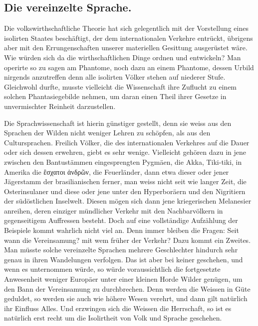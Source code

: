 {\subsection*{Die vereinzelte Sprache.}
\largerpage[2] Die volkswirthschaftliche Theorie hat sich gelegentlich mit der Vorstellung eines isolirten Staates beschäftigt, der dem internationalen Verkehre entrückt, übrigens aber mit den Errungenschaften unserer materiellen Gesittung ausgerüstet wäre. Wie würden sich da die wirthschaftlichen Dinge ordnen und entwickeln? \label{sp.177} Man operirte so zu sagen am Phantome, noch dazu an einem Phantome, dessen Urbild nirgends anzutreffen  denn alle isolirten Völker stehen auf niederer  Stufe. Gleichwohl durfte, musste vielleicht die Wissenschaft ihre Zuflucht zu einem solchen Phantasiegebilde nehmen, um daran einen Theil ihrer Gesetze in unvermischter Reinheit darzustellen.

\label{fp.186}

Die Sprachwissenschaft ist hierin günstiger gestellt, denn sie weiss aus den Sprachen der Wilden nicht weniger Lehren zu schöpfen, als aus den Cultursprachen. Freilich Völker, die des internationalen Verkehres auf die Dauer  oder sich dessen erwehren, giebt es sehr wenige. Vielleicht gehören dazu in  jene zwischen den Bantustämmen eingesprengten Pygmäen, die Akka, Tiki-tiki, in Amerika die ἒσχατοι ἀνδρῶν, die Feuerländer, dann etwa dieser oder jener Jägerstamm der brasilianischen  ferner, man weiss nicht seit wie langer Zeit, die Osterinsulaner und diese oder jene unter den Hyperboräern und den Nigritiern der südöstlichen Inselwelt. Diesen mögen sich dann jene kriegerischen Melanesier anreihen, deren einziger mündlicher Verkehr mit den Nachbarvölkern in gegenseitigem Auffressen besteht. Doch auf eine vollständige Aufzählung der Beispiele kommt wahrlich nicht viel an. Denn immer bleiben die Fragen: Seit wann die Vereinsamung? mit wem früher der Verkehr? Dazu kommt ein Zweites. Man müsste solche vereinzelte Sprachen mehrere Geschlechter hindurch sehr genau in ihren Wandelungen verfolgen. Das ist aber bei keiner geschehen, und wenn es unternommen würde, so würde voraussichtlich die fortgesetzte Anwesenheit weniger Europäer unter einer kleinen Horde Wilder genügen, um den Bann der Vereinsamung zu durchbrechen. Denn werden die Weissen in Güte geduldet, so werden sie auch wie höhere Wesen verehrt, und dann gilt natürlich ihr Einfluss Alles. Und erzwingen sich die Weissen die Herrschaft, so ist es natürlich erst recht um die Isolirtheit von Volk und Sprache geschehen.

}
